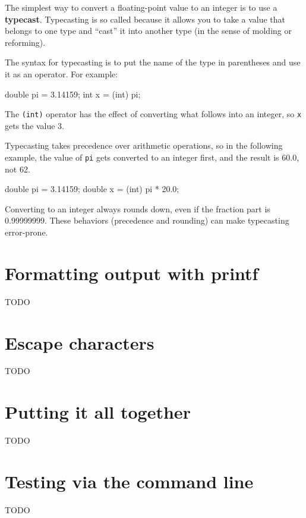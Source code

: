 The simplest way to convert a floating-point value to an integer is to use a {\bf typecast}.
Typecasting is so called because it allows you to take a value that belongs to one type and ``cast'' it into another type (in the sense of molding or reforming).

The syntax for typecasting is to put the name of the type in parentheses and use it as an operator.
For example:

\begin{code}
    double pi = 3.14159;
    int x = (int) pi;
\end{code}

The {\tt(int)} operator has the effect of converting what follows into an integer, so {\tt x} gets the value 3.

Typecasting takes precedence over arithmetic operations, so in the following example, the value of {\tt pi} gets converted to an integer first, and the result is 60.0, not 62.

\begin{code}
    double pi = 3.14159;
    double x = (int) pi * 20.0;
\end{code}

Converting to an integer always rounds down, even if the fraction part is 0.99999999.
These behaviors (precedence and rounding) can make typecasting error-prone.


\section{Formatting output with printf}

TODO


\section{Escape characters}

TODO


\section{Putting it all together}

TODO


\section{Testing via the command line}

TODO

